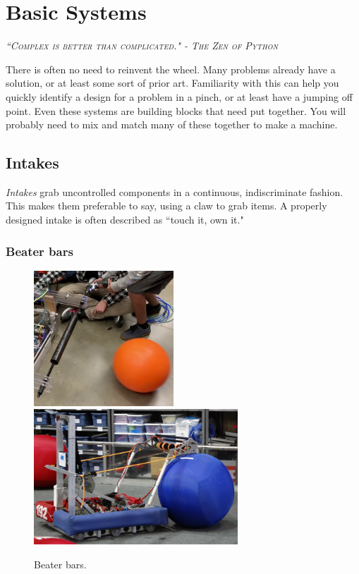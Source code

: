 
\chapter{Basic Systems}

 {\slshape \scshape ``Complex is better than complicated." - The Zen of Python}
 
 There is often no need to reinvent the wheel. Many problems already have a solution, or at least some sort of prior art. Familiarity with this can help you quickly identify a design for a problem in a pinch, or at least have a jumping off point. Even these systems are building blocks that need put together. You will probably need to mix and match many of these together to make a machine.
 

\section{Intakes} \label{sec:intakes}

\textit{Intakes} grab uncontrolled components in a continuous, indiscriminate fashion. This makes them preferable to say, using a claw to grab items. A properly designed intake is often described as ``touch it, own it."

\subsection{Beater bars} 


\begin{figure}[H]
	\includegraphics[height=2in]{imgs/intake_beaterbar_1.png}
	\includegraphics[height=2in]{imgs/intake_beaterbar_2.png}
	\caption{Beater bars.}
\end{figure}

